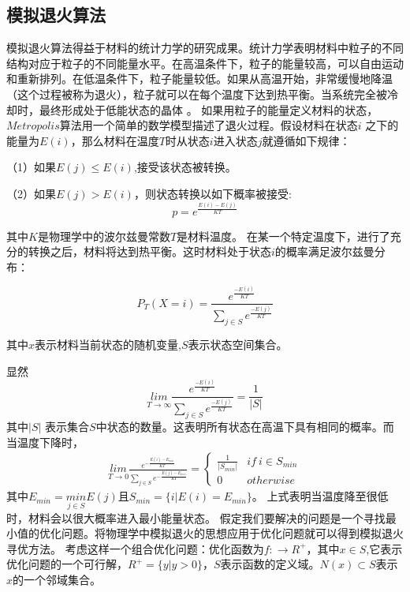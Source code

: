 \documentclass[10.5pt,twocolumn]{jbuaa}
\begin{document}
\subsection{模拟退火算法}
模拟退火算法得益于材料的统计力学的研究成果。统计力学表明材料中粒子的不同结构对应于粒子的不同能量水平。在高温条件下，粒子的能量较高，可以自由运动和重新排列。在低温条件下，粒子能量较低。如果从高温开始，非常缓慢地降温（这个过程被称为退火），粒子就可以在每个温度下达到热平衡。当系统完全被冷却时，最终形成处于低能状态的晶体 。
如果用粒子的能量定义材料的状态，$Metropolis$算法用一个简单的数学模型描述了退火过程。假设材料在状态$i$ 之下的能量为$E(i)$，那么材料在温度$T$时从状态$i$进入状态$j$就遵循如下规律：

  （1）如果$E(j) \le E(i)$,接受该状态被转换。
  
  （2）如果$E(j) > E(i)$，则状态转换以如下概率被接受:
\begin{equation}
   p = e^{\frac{E(i)-E(j)}{KT}}
\end{equation}

其中$K$是物理学中的波尔兹曼常数$T$是材料温度。
在某一个特定温度下，进行了充分的转换之后，材料将达到热平衡。这时材料处于状态$i$的概率满足波尔兹曼分布：

\begin{equation}
P_{T}(X=i)=\frac{e^{\frac{-E(i)}{KT}}}{\underset{j \in S}{\sum} e^{\frac{-E(j)}{KT}}}
\end{equation}

其中$x$表示材料当前状态的随机变量,$S$表示状态空间集合。

显然
\begin{equation}
\underset{T\rightarrow \infty}{lim}\frac{e^{\frac{-E(i)}{KT}}}{\underset{j \in S}{\sum} e^{\frac{-E(j)}{KT}}}=\frac{1}{|S|}
\end{equation}
其中$|S|$ 表示集合$S$中状态的数量。这表明所有状态在高温下具有相同的概率。而当温度下降时，
\begin{align}
\underset{T\rightarrow 0}{lim}\frac{e^{-\frac{E(i)-E_{min}}{KT}}}{\underset{j \in S}{\sum} e^{-\frac{E(j)-E_{min}}{KT}}}=
\begin{cases}
\frac{1}{|S_{min}|}&if\ i\in S_{min}\\
0  &otherwise
\end{cases}
\end{align}
其中$E_{min}=\underset {j \in S}{min}E(j)$且$S_{min}=\{i|E(i)=E_{min}\}$。
上式表明当温度降至很低时，材料会以很大概率进入最小能量状态。
假定我们要解决的问题是一个寻找最小值的优化问题。将物理学中模拟退火的思想应用于优化问题就可以得到模拟退火寻优方法。
考虑这样一个组合优化问题：优化函数为$f:\rightarrow R^{+}$，其中$x\in S$,它表示优化问题的一个可行解，$R^{+}=\{y|y>0\}$，$S$表示函数的定义域。$N(x)\subset S$表示$x$的一个邻域集合。
\end{document}
